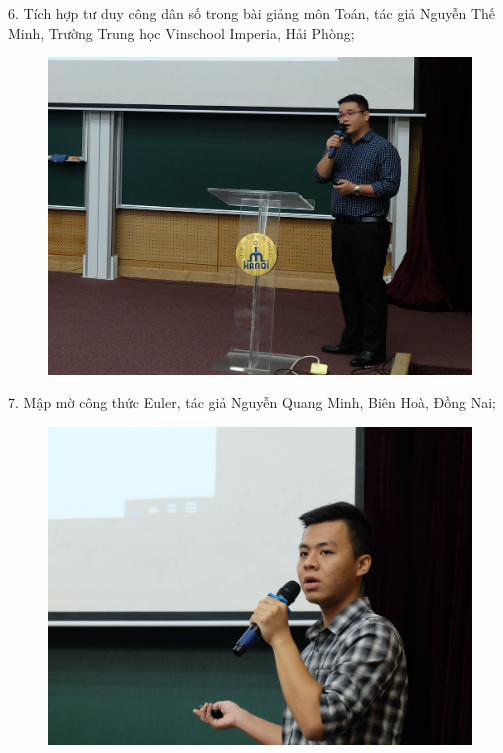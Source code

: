 \begin{multicols}{2}
\begin{figure}[H]
		\vspace*{-15pt}
	\end{figure}
	$6$. Tích hợp tư duy công dân số trong bài giảng môn Toán, tác giả Nguyễn Thế Minh, Trường Trung học Vinschool Imperia, Hải Phòng; 
	\begin{figure}[H]
		\vspace*{-5pt}
		\centering
		\captionsetup{labelformat= empty, justification=centering}
		\includegraphics[width= 1\linewidth]{7}
		\vspace*{-15pt}
	\end{figure}
	$7$. Mập mờ công thức Euler, tác giả Nguyễn Quang Minh, Biên Hoà, Đồng Nai; 
	\begin{figure}[H]
		\vspace*{-5pt}
		\centering
		\captionsetup{labelformat= empty, justification=centering}
		\includegraphics[width= 1\linewidth]{8}

\end{figure}
\end{multicols}

